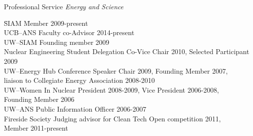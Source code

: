 \documentclass{resume2} %
\begin{document}
\begin{rSection}{Professional Service}
\textit{Energy and Science}
\begin{tabbing}
\hspace*{2 em}\= SIAM  \hspace*{15em} \= Member 2009-present\\
%
\> UCB--ANS \> Faculty co-Advisor 2014-present  \\
%
\> UW--SIAM \> Founding member 2009\\
%
\> Nuclear Engineering Student Delegation \> Co-Vice Chair 2010, Selected Participant 2009\\
%
\> UW--Energy Hub \> Conference Speaker Chair 2009, Founding Member 2007,  \\ \> \> liaison to Collegiate Energy Association 2008-2010\\
%
\> UW--Women In Nuclear \> President 2008-2009, Vice President 2006-2008,  \\ \> \> Founding Member 2006\\
%
\> UW--ANS \> Public Information Officer 2006-2007 \\
%
\> Fireside Society \> Judging advisor for Clean Tech Open competition 2011,  \\ \> \>Member 2011-present
\end{tabbing}

\end{rSection}


\end{document}
